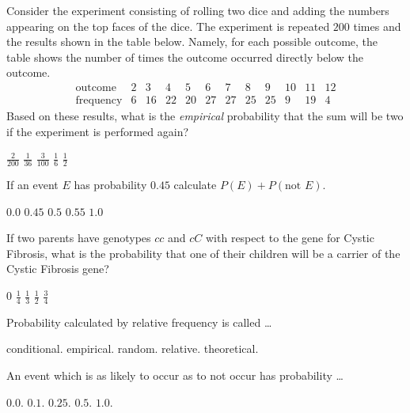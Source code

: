 \documentclass[answers,12pt]{exam}
\begin{document}
\begin{questions}
\question Consider the experiment consisting
of rolling two dice and adding the numbers
appearing on the top faces of the dice.
The experiment is repeated $200$ times and the
results shown in the table below. Namely, 
for each possible outcome, the table shows the number
of times the outcome occurred directly below the outcome.
\[\begin{array}{r|ccccccccccc}
\text{outcome}&2&3&4&5&6&7&8&9&10&11&12\\\hline
\text{frequency}&6&16&22&20&27&27&25&25&9&19&4
\end{array}\]
Based on these results, what is the {\em empirical} probability
that the sum will be two if the experiment is performed again?\\
\begin{oneparchoices}
\choice $\frac{2}{200}$
\choice $\frac{1}{36}$
\choice $\frac{3}{100}$
\choice $\frac{1}{6}$
\choice $\frac{1}{2}$
\end{oneparchoices}

\question If an event $E$ has probability $0.45$
calculate $P\left(E\right)+P\left(\text{not $E$}\right)$.\\
\begin{oneparchoices}
\choice $0.0$
\choice $0.45$
\choice $0.5$
\choice $0.55$
\choice $1.0$
\end{oneparchoices}

\question If two parents have genotypes $cc$ and $cC$
with respect to the gene for Cystic Fibrosis, what
is the probability that one of their children will be
a carrier of the Cystic Fibrosis gene?\\
\begin{oneparchoices}
\choice $0$
\choice $\frac{1}{4}$
\choice $\frac{1}{3}$
\choice $\frac{1}{2}$
\choice $\frac{3}{4}$
\end{oneparchoices}

\question Probability calculated by relative frequency is called \dots\\
\begin{oneparchoices}
\choice conditional.
\choice empirical.
\choice random.
\choice relative.
\choice theoretical.
\end{oneparchoices}

\question An event which is as likely to occur as to not occur has probability \dots\\
\begin{oneparchoices}
\choice $0.0$.
\choice $0.1$.
\choice $0.25$.
\choice $0.5$.
\choice $1.0$.
\end{oneparchoices}

\end{questions}
\end{document}
